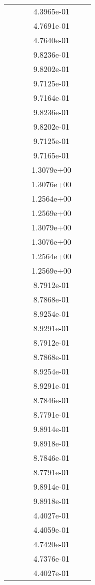 \begin{xltabular}{\textwidth}{r|rS[table-format=1.3e+2]S[table-format=1.4e+2]S[table-format=1.4e+2]S[table-format=-1.5]}
&  &  & 4.3965e-01 & & \\
&  &  & 4.7691e-01 & & \\
&  &  & 4.7640e-01 & & \\
&  &  & 9.8236e-01 & & \\
&  &  & 9.8202e-01 & & \\
&  &  & 9.7125e-01 & & \\
&  &  & 9.7164e-01 & & \\
&  &  & 9.8236e-01 & & \\
&  &  & 9.8202e-01 & & \\
&  &  & 9.7125e-01 & & \\
&  &  & 9.7165e-01 & & \\
&  &  & 1.3079e+00 & & \\
&  &  & 1.3076e+00 & & \\
&  &  & 1.2564e+00 & & \\
&  &  & 1.2569e+00 & & \\
&  &  & 1.3079e+00 & & \\
&  &  & 1.3076e+00 & & \\
&  &  & 1.2564e+00 & & \\
&  &  & 1.2569e+00 & & \\
&  &  & 8.7912e-01 & & \\
&  &  & 8.7868e-01 & & \\
&  &  & 8.9254e-01 & & \\
&  &  & 8.9291e-01 & & \\
&  &  & 8.7912e-01 & & \\
&  &  & 8.7868e-01 & & \\
&  &  & 8.9254e-01 & & \\
&  &  & 8.9291e-01 & & \\
&  &  & 8.7846e-01 & & \\
&  &  & 8.7791e-01 & & \\
&  &  & 9.8914e-01 & & \\
&  &  & 9.8918e-01 & & \\
&  &  & 8.7846e-01 & & \\
&  &  & 8.7791e-01 & & \\
&  &  & 9.8914e-01 & & \\
&  &  & 9.8918e-01 & & \\
&  &  & 4.4027e-01 & & \\
&  &  & 4.4059e-01 & & \\
&  &  & 4.7420e-01 & & \\
&  &  & 4.7376e-01 & & \\
&  &  & 4.4027e-01 & & \\

\end{xltabular}
